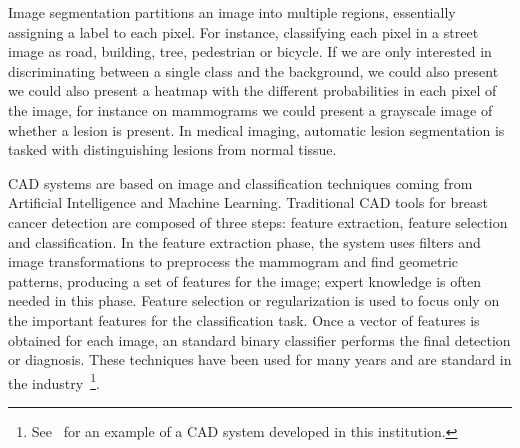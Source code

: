 Image segmentation partitions an image into multiple regions, essentially assigning a label to each pixel. For instance, classifying each pixel in a street image as road, building, tree, pedestrian or bicycle. If we are only interested in discriminating between a single class and the background, we could also present
we could also present a heatmap with the different probabilities in each pixel of the image, for instance on mammograms we could present a grayscale image of whether a lesion is present.
In medical imaging, automatic lesion segmentation is tasked with distinguishing lesions from normal tissue.

CAD systems are based on image and classification techniques coming from Artificial Intelligence and Machine Learning. Traditional CAD tools for breast cancer detection are composed of three steps: feature extraction, feature selection and classification. In the feature extraction phase, the system uses filters and image transformations to preprocess the mammogram and find geometric patterns, producing a set of features for the image; expert knowledge is often needed in this phase. Feature selection or regularization is used to focus only on the important features for the classification task. Once a vector of features is obtained for each image, an standard binary classifier performs the final detection or diagnosis. These techniques have been used for many years and are standard in the industry~\footnote{See~\cite{Hernandez2014} for an example of a CAD system developed in this institution.}. 

